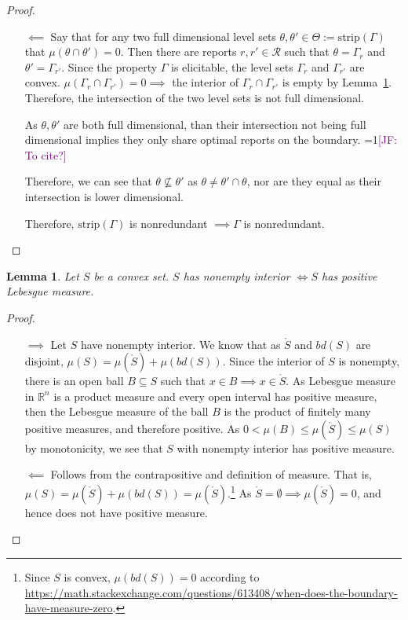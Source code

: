 \documentclass[12pt]{article}
\newcommand{\Comments}{1}
\newcommand{\mynote}[2]{\ifnum\Comments=1\textcolor{#1}{#2}\fi}
\newcommand{\jessie}[1]{\mynote{purple}{[JF: #1]}}
\newcommand{\reals}{\mathbb{R}}
\newcommand{\R}{\mathcal{R}}
\newcommand{\inter}[1]{\mathring{#1}}%
\newcommand{\strip}{\mathrm{strip}}
\newtheorem{lemma}{Lemma}
\begin{document}
\begin{proof}
\begin{enumerate}
		
		\item[$\impliedby$] 
		Say that for any two full dimensional level sets $\theta, \theta' \in \Theta := \strip(\Gamma)$ that $\mu(\theta \cap \theta') = 0$.
		Then there are reports $r, r' \in \R$ such that $\theta = \Gamma_r$ and $\theta' = \Gamma_{r'}$.
		Since the property $\Gamma$ is elicitable, the level sets $\Gamma_r$ and $\Gamma_{r'}$ are convex.
		$\mu(\Gamma_r \cap \Gamma_{r'}) = 0 \implies$ the interior of $\Gamma_r \cap \Gamma_{r'}$ is empty by Lemma~\ref{lem:pos-measure-iff-nonempty-int}.
		Therefore, the intersection of the two level sets is not full dimensional.
		
		As $\theta, \theta'$ are both full dimensional, than their intersection not being full dimensional implies they only share optimal reports on the boundary. \jessie{To cite?}
		
		Therefore, we can see that $\theta \not \subseteq \theta'$ as $\theta \neq \theta' \cap \theta$, nor are they equal as their intersection is lower dimensional.
		
		Therefore, $\strip(\Gamma)$ is nonredundant $\implies \Gamma$ is nonredundant.
	\end{enumerate}
	
\end{proof}

\begin{lemma}\label{lem:pos-measure-iff-nonempty-int}
	Let $S$ be a convex set.
	$S$ has nonempty interior $\iff S$ has positive Lebesgue measure.
\end{lemma}
\begin{proof}
	
	\begin{enumerate}
		\item[$\implies$]
		Let $S$ have nonempty interior.
		We know that as $\inter{S}$ and $bd(S)$ are disjoint, $\mu(S) = \mu(\inter{S}) + \mu(bd(S))$.
		Since the interior of $S$ is nonempty, there is an open ball $B \subseteq S$ such that $x \in B \implies x \in \inter S$.
		As Lebesgue measure in $\reals^n$ is a product measure and every open interval has positive measure, then the Lebesgue measure of the ball $B$ is the product of finitely many positive measures, and therefore positive.
		As $0 < \mu(B) \leq \mu(\inter S) \leq \mu(S)$ by monotonicity, we see that $S$ with nonempty interior has positive measure.
		
		\item[$\impliedby$]  Follows from the contrapositive and definition of measure.
		That is, $\mu(S) = \mu(\inter{S}) + \mu(bd(S)) = \mu(\inter{S})$.\footnote{Since $S$ is convex, $\mu(bd(S)) = 0$ according to \url{https://math.stackexchange.com/questions/613408/when-does-the-boundary-have-measure-zero}.}
		As $\inter{S} = \emptyset \implies \mu(\inter{S}) = 0$, and hence does not have positive measure.
	\end{enumerate}
\end{proof}
\end{document}
